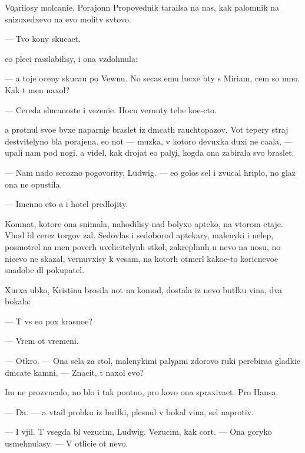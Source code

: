 \documentclass[10pt]{book}
\begin{document}
Vo{\c}arilosy molcani{\y}e. Porajonn{\yi}{\y} Pro\-po\-ved\-nik tara{\x}ilsa na nas, kak palomnik na snizoxedxevo na {\y}evo molitv{\yi} sv{\ia}tovo.

— Tvo{\y} kony skuca{\y}et.

{\Y}e{\y}o pleci rasslabilisy, i ona vzdohnula:

— {\Y}a toje oceny skuca{\y}u po Vewnu. No se{\y}cas {\y}emu lucxe b{\yi}ty s Mi\-ri\-am, cem so mno{\y}. Kak t{\yi} men{\ia} naxol?

— Cereda sluca{\y}noste{\y} i vezeni{\y}e. Hocu vernuty tebe ko{\y}e-cto.

{\Y}a pro\-t{\ia}\-nul svo{\y}e{\y} b{\yi}vxe{\y} naparni{\c}e braslet iz d{\yi}mcat{\yi}h rauchtopazov. Vot tepery straj de{\y}stvitelyno b{\yi}la porajena. {\Y}e{\y}o not{\yi} — muz{\yi}ka, v kotoro{\y} devuxka duxi ne ca{\y}ala, — upali nam pod nogi. {\Y}a videl, kak drojat {\y}e{\y}o paly{\c}i, kogda ona zabirala svo{\y} braslet.

— Nam nado ser{\y}ozno po\-go\-vo\-rity, Ludwig. — {\Y}e{\y}o golos sel i zvucal hriplo, no glaz ona ne opustila.

— Imenno eto {\y}a i hotel predlojity.



Komnat{\yi}, ko\-to\-r{\yi}\-{\y}e ona snimala, nahodilisy nad bolyxo{\y} apteko{\y}, na vtorom etaje. Vhod b{\yi}l cerez torgov{\yi}{\y} zal. Sedovlas{\yi}{\y} i sedoborod{\yi}{\y} aptekary, ma\-leny\-ki{\y} i nelep{\yi}{\y}, posmotrel na men{\ia} poverh uvelicitelyn{\yi}h st{\e}kol, zakrepl{\e}nn{\yi}h u nevo na nosu, no nicevo ne skazal, vernuvxisy k vesam, na kotor{\yi}h otmer{\ia}l kako{\y}e-to koricnevo{\y}e snadob{\y}e dl{\ia} pokupatel{\ia}.

Xurxa {\y}ubko{\y}, Kristina brosila not{\yi} na komod, dostala iz nevo but{\yi}lku vina, dva bokala:

— T{\yi} vs{\e} {\y}e{\x}o p{\y}ox krasno{\y}e?

— Vrem{\ia} ot vremeni.

— Otkro{\y}. — Ona sela za stol, malenykimi paly{\c}ami zdorovo{\y} ruki perebira{\y}a gladki{\y}e d{\yi}mcat{\yi}{\y}e kamni. — Znacit, t{\yi} naxol {\y}evo?

Im{\ia} ne prozvucalo, no b{\yi}lo i tak pon{\ia}tno, pro kovo ona spraxiva{\y}et. Pro Hansa.

— Da. — {\Y}a v{\yi}ta{\x}il probku iz but{\yi}lki, plesnul v bokal{\yi} vina, sel naprotiv.

— I v{\yi}jil. T{\yi} vsegda b{\yi}l vezucim, Ludwig. Vezucim, kak cort. — Ona goryko usmehnulasy. — V otlici{\y}e ot nevo.
\end{document}
